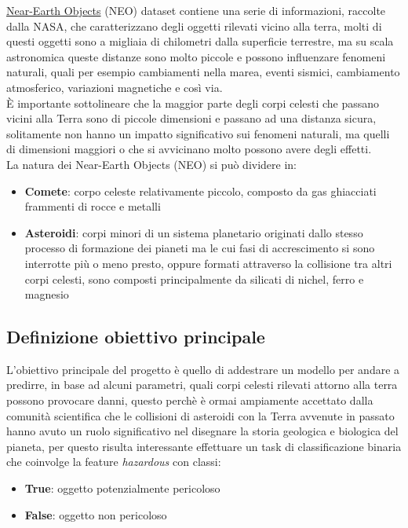 \documentclass[italian,12pt,a4paper]{article}
\begin{document}
	\href{https://www.kaggle.com/datasets/sameepvani/nasa-nearest-earth-objects/}{Near-Earth Objects} (NEO) dataset contiene una serie di informazioni, raccolte dalla NASA, che caratterizzano degli oggetti rilevati vicino alla terra, molti di questi oggetti sono a migliaia di chilometri dalla superficie terrestre, ma su scala astronomica queste distanze sono molto piccole e possono influenzare fenomeni naturali, quali per esempio cambiamenti nella marea, eventi sismici, cambiamento atmosferico, variazioni magnetiche e così via. \\
	È importante sottolineare che la maggior parte degli corpi celesti che passano vicini alla Terra sono di piccole dimensioni e passano ad una distanza sicura, solitamente non hanno un impatto significativo sui fenomeni naturali, ma quelli di dimensioni maggiori o che si avvicinano molto possono avere degli effetti. \\
	\linebreak
	La natura dei Near-Earth Objects (NEO) si può dividere in:
	\begin{itemize}
		\item \textbf{Comete}: corpo celeste relativamente piccolo, composto da gas ghiacciati frammenti di rocce e metalli
		\item \textbf{Asteroidi}: corpi minori di un sistema planetario originati dallo stesso processo di formazione dei pianeti ma le cui fasi di accrescimento si sono interrotte più o meno presto, oppure formati attraverso la collisione tra altri corpi celesti, sono composti principalmente da silicati di nichel, ferro e magnesio
	\end{itemize}

	
	\subsection{Definizione obiettivo principale}
	L'obiettivo principale del progetto è quello di addestrare un modello per andare a predirre, in base ad alcuni parametri, quali corpi celesti rilevati attorno alla terra possono provocare danni, questo perchè è ormai ampiamente accettato dalla comunità scientifica che le collisioni di asteroidi con la Terra avvenute in passato hanno avuto un ruolo significativo nel disegnare la storia geologica e biologica del pianeta, per questo risulta interessante effettuare un task di classificazione binaria che coinvolge la feature \textit{hazardous} con classi:
	\begin{itemize}
		\item \textbf{True}: oggetto potenzialmente pericoloso
		\item \textbf{False}: oggetto non pericoloso
	\end{itemize}
	
\end{document}
